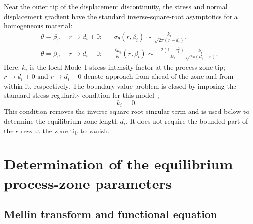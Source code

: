 \documentclass[pdflatex,onecolumn,sn-mathphys-ay]{sn-jnl}
\begin{document}
Near the outer tip of the displacement discontinuity, the stress and normal
displacement gradient have the standard inverse-square-root asymptotics for a
homogeneous material:
\begin{equation}
\label{eq:zone-tip-asymptotics}
\begin{aligned}
  &\theta=\beta_i,\quad r\to d_i+0:
  &&\sigma_\theta(r,\beta_i)
    \sim \frac{k_i}{\sqrt{2\pi(r-d_i)}},\\[3pt]
  &\theta=\beta_i,\quad r\to d_i-0:
  &&\frac{\partial u_\theta}{\partial r}(r,\beta_i)
    \sim -\frac{2(1-\nu_i^2)}{E_i}
    \frac{k_i}{\sqrt{2\pi(d_i-r)}}.
\end{aligned}
\end{equation}
Here, $k_i$ is the local Mode~I stress intensity factor at the process-zone
tip; $r\to d_i+0$ and $r\to d_i-0$ denote approach from ahead of the
zone and from within it, respectively. The boundary-value problem is closed by
imposing the standard stress-regularity condition for this
model~\citep{KaminskyDudykPolishchuk2024},
\begin{equation*}
  k_i=0.
\end{equation*}
This condition removes the inverse-square-root singular term and is
used below to determine the equilibrium zone length $d_i$. It does not
require the bounded part of the stress at the zone tip to vanish.


\section{Determination of the equilibrium process-zone parameters}
\label{sec:derivation}

\subsection{Mellin transform and functional equation}
\label{subsec:mellin}
\end{document}
